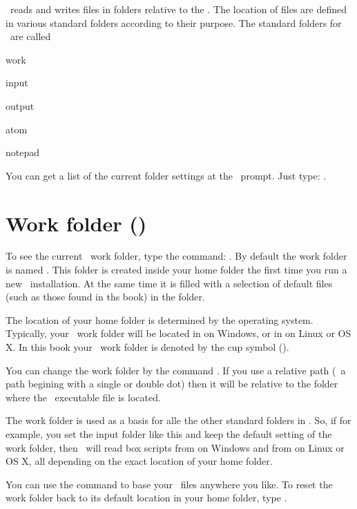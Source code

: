 \US\ reads and writes files in folders relative to the . The location of files are defined in various standard folders according to their purpose. The standard folders for \US\ are called
\begin{compactitem}
\item work
\item input
\item output
\item atom
\item notepad
\end{compactitem}

You can get a list of the current folder settings at the \US\ prompt. Just type: .

\section{Work folder (\protect\ushome)}
To see the current \US\ work folder, type the command: . By default the work folder is named . This folder is created inside your home folder the first time you run a new \US\ installation. At the same time it is filled with a selection of default files (such as those found in ths book) in the  folder. 

The location of your home folder is determined by the operating system. Typically, your \US\ work folder will be located in  on Windows, or in  on Linux or OS X. In this book your \US\ work folder is denoted by the cup symbol (\ushome). 

You can change the work folder by the command . If you use a relative path (\ie\ a path begining with a single or double dot) then it will be relative to the folder where the \US\ executable file is located.

The work folder is used as a basis for alle the other standard folders in \US. So, if for example, you set the input folder like this  and keep the default setting of the work folder, then \US\ will read box scripts from  on Windows and from  on Linux or OS X, all depending on the exact location of your home folder.

You can use the  command to base your \US\ files anywhere you like. To reset the work folder back to its default location in your home folder, type .


